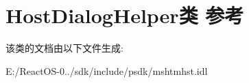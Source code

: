 \hypertarget{class_host_dialog_helper}{}\section{Host\+Dialog\+Helper类 参考}
\label{class_host_dialog_helper}


该类的文档由以下文件生成\+:\begin{DoxyCompactItemize}
\item 
E\+:/\+React\+O\+S-\/0../sdk/include/psdk/mshtmhst.\+idl\end{DoxyCompactItemize}
